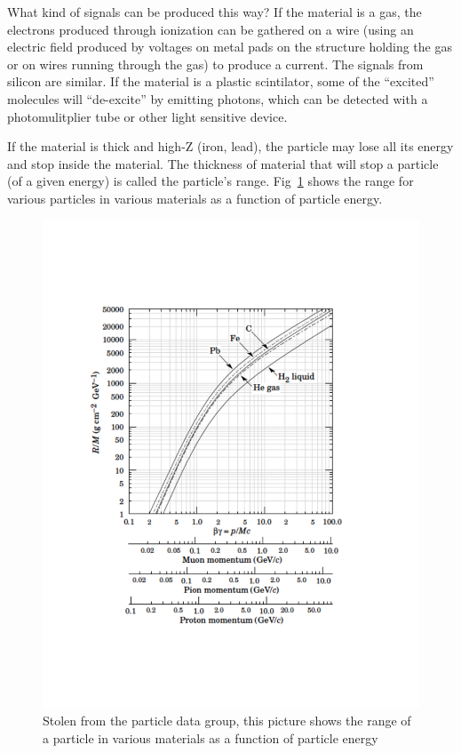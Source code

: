 What kind of signals can be produced this way?  If the material is a gas, the electrons produced through ionization can be gathered on a wire (using an electric field produced by voltages on metal pads on the structure holding the gas or on wires running through the gas) to produce a current.  The signals from silicon are similar.  If the material is a plastic scintilator, some of the ``excited'' molecules will ``de-excite'' by emitting photons, which can be detected with a photomulitplier tube or other light sensitive device.

If the material is thick and high-Z (iron, lead), the particle may lose all its energy and 
stop inside the material.  The thickness of material that will stop a particle (of a given energy) is called the particle's range.  Fig~\ref{fig:pdgrange} shows the range for various particles in various materials as a function of particle energy.


\begin{figure}[h]
\centering\includegraphics[scale=0.5]{./particleinteractions/Pictures/pdgrange.pdf}
\caption{Stolen from the particle data group, this picture shows the range of a particle in various materials as a function of particle energy }
\label{fig:pdgrange}
\end{figure}

